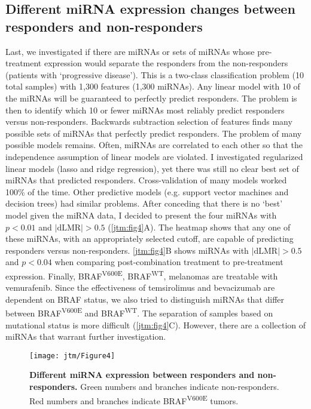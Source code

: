 \subsection{Different miRNA expression changes between responders and non-responders}
Last, we investigated if there are miRNAs or sets
of miRNAs whose pre-treatment expression would separate the responders from the non-responders
(patients with `progressive disease'). This is a two-class
classification problem (10 total samples) with 1,300 features (1,300 miRNAs). 
Any linear model with 10 of the miRNAs will be guaranteed to perfectly predict
responders. The problem is then to identify which 10 or fewer miRNAs
most reliably predict responders versus non-responders. Backwards subtraction 
selection of features finds many possible sets of miRNAs
that perfectly predict responders. The problem of many possible models remains.
Often, miRNAs are correlated to each other so that
the independence assumption of linear models are violated. I investigated 
regularized linear models (lasso and ridge regression), yet there was still no clear
best set of miRNAs that predicted responders. Cross-validation of many models
worked 100\% of the time. Other predictive models (e.g. support vector machines and
decision trees) had similar problems. After conceding that there is no `best' model given
the miRNA data, I decided to present the four miRNAs with $p<0.01$ and $|\text{dLMR}|>0.5$
(\autoref{jtm:fig4}A). The heatmap shows that any one of these miRNAs, with an
appropriately selected cutoff, are capable of predicting responders versus non-responders.
\autoref{jtm:fig4}B shows miRNAs with $|\text{dLMR}|>0.5$ and $p<0.04$ when comparing post-combination
treatment to pre-treatment expression. Finally, BRAF\textsuperscript{V600E}, BRAF\textsuperscript{WT}, melanomas are 
treatable with vemurafenib. Since the effectiveness of temsirolimus and
bevacizumab are dependent on BRAF status, we also tried to distinguish 
miRNAs that differ between BRAF\textsuperscript{V600E} and BRAF\textsuperscript{WT}.
The separation of samples based on mutational status is more difficult (\autoref{jtm:fig4}C).
However, there are a collection of miRNAs that warrant further investigation.

\begin{figure}
  \centering
  \texttt{[image: jtm/Figure4]}
  \caption[Different miRNA expression between responders and non-responders]{
       \textbf{Different miRNA expression between responders and non-responders.}
       Green numbers and branches indicate non-responders. Red numbers and branches indicate
       BRAF\textsuperscript{V600E} tumors.
  }
  \label{jtm:fig4}
\end{figure}

